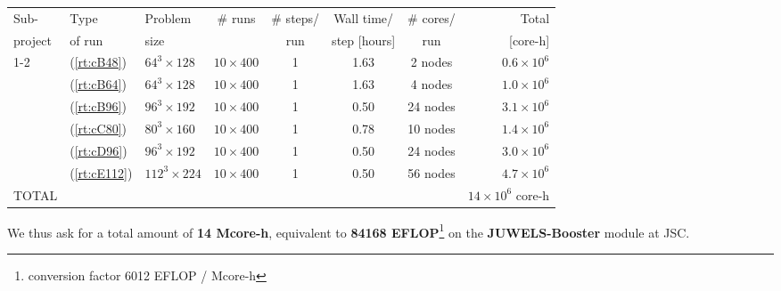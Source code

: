 \begin{center}
	{\small
		\begin{tabular}{lllccccr} \hline\hline
			Sub-         &
			Type         &
			Problem      &
			\# runs      &
			\# steps/    &
			Wall time/   &
			\# cores/    &
			Total                                                                                                                \\
			project      &
			of run       &
			size         &
			             &
			run          &
			step [hours] &
			run          &
			[core-h]                                                                                                             \\
			\hline\hline
			1-2          & (\ref{rt:cB48})  & $64^3\times 128$  & $10\times 400$ & 1 & 1.63 & 2 nodes  & $0.6 \times 10^6$       \\
			             & (\ref{rt:cB64})  & $64^3\times 128$  & $10\times 400$ & 1 & 1.63 & 4 nodes  & $1.0 \times 10^6$       \\
			             & (\ref{rt:cB96})  & $96^3\times 192$  & $10\times 400$ & 1 & 0.50 & 24 nodes & $3.1 \times 10^6$       \\
			             & (\ref{rt:cC80})  & $80^3\times 160$  & $10\times 400$ & 1 & 0.78 & 10 nodes & $1.4 \times 10^6$       \\
			             & (\ref{rt:cD96})  & $96^3\times 192$  & $10\times 400$ & 1 & 0.50 & 24 nodes & $3.0 \times 10^6$       \\
						 & (\ref{rt:cE112})  & $112^3\times 224$  & $10\times 400$ & 1 & 0.50 & 56 nodes & $4.7 \times 10^6$       \\
			\hline\hline
			TOTAL        &                  &                   &                &   &      &          & $14\times 10^6$ core-h \\
		\end{tabular}
	}
\end{center}
\bigskip
We thus ask for a total amount of \textbf{14 Mcore-h}, equivalent to \textbf{84168 EFLOP}\footnote{conversion factor 6012 EFLOP / Mcore-h}  on the \textbf{JUWELS-Booster} module at JSC.

